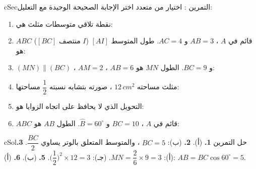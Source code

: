 \documentclass[12pt,a4paper]{article}
\newenvironment{BOX}[2]{\begin{otherlanguage}{english}\begin{arbox}{#1}{#2}}{\end{arbox}\end{otherlanguage}}
\newcounter{exo}
\newenvironment{tamrin}[1]{\stepcounter{exo}\begin{BOX}{cSec}{التمرين \theexo: #1}}{\end{BOX}}
\newenvironment{hal}{\Needspace{12\baselineskip}\begin{otherlanguage}{english}\begin{arbox}[breakable]{cSol}{حل التمرين \theexo}}{\end{arbox}\end{otherlanguage}}
\begin{document}
\begin{tamrin}{اختيار من متعدد}
اختر الإجابة الصحيحة الوحيدة مع التعليل:
\begin{enumerate}
\item نقطة تلاقي متوسطات مثلث هي:
\item $ABC$ قائم في $A$ ، $AB=3$ و $AC=4$. طول المتوسط $[AI]$ ($I$ منتصف $[BC]$) هو:
\item $(MN)\parallel(BC)$ ، $AM=2$ ، $AB=6$ و $BC=9$. الطول $MN$ هو:
\item مثلث مساحته $12\,cm^2$ ، صورته بتشابه نسبته $\dfrac12$ مساحتها:
\item التحويل الذي لا يحافظ على اتجاه الزوايا هو:
\item $ABC$ قائم في $A$ ، $BC=10$ و $\widehat B=60^\circ$. الطول $AB$ هو:
\end{enumerate}
\end{tamrin}
\begin{hal}
\textbf{1.} (أ). \quad \textbf{2.} (ب): $BC=5$ ، والمتوسط المتعلق بالوتر يساوي $\dfrac{BC}2$. \quad \textbf{3.} (أ): $MN=\dfrac26\times9=3$.
 (جـ): $\Big(\dfrac12\Big)^2\times12=3$. \quad \textbf{5.} (ب). \quad \textbf{6.} (أ): $AB=BC\cos60^\circ=5$.
\end{hal}
\end{document}
